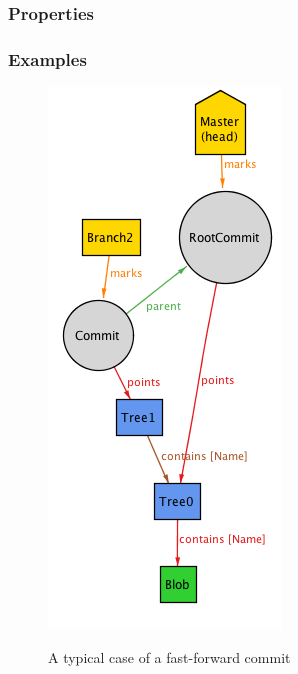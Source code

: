 \subsubsection{Properties}

\subsubsection{Examples}
\begin{figure} 
	\caption{A typical case of a fast-forward commit}
	\centering
	\includegraphics[scale=0.65]{images/fastforward.png}
	\label{fig:fastforward}
\end{figure}
